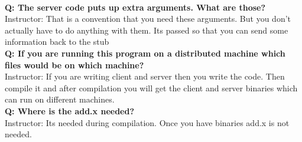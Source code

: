\documentclass[twoside]{article}
\begin{document}
\\\textbf{Q: The server code puts up extra arguments. What are those?}
\\{Instructor: That is a convention that you need these arguments. But you don't actually have to do anything with them. Its passed so that you can send some information back to the stub}
\\\textbf{Q: If you are running this program on a distributed machine which files would be on which machine?}
\\{Instructor: If you are writing client and server then you write the code. Then compile it and after compilation you will get the client and server binaries which can run on different machines.}
\\\textbf{Q: Where is the add.x needed?}
\\{Instructor: Its needed during compilation. Once you have binaries add.x is not needed.}
\end{document}
